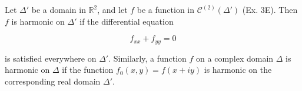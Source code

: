 Let $\Delta'$ be a domain in $\mathbb{R}^2$, and let $f$ be a function in $\mathcal{C}^{(2)}(\Delta')$ (Ex. 3E). Then $f$ is harmonic on $\Delta'$ if the differential equation

$$f_{xx} + f_{yy} = 0$$

is satisfied everywhere on $\Delta'$. Similarly, a function $f$ on a complex domain $\Delta$ is harmonic on $\Delta$ if the function $f_0(x, y) = f(x + iy)$ is harmonic on the corresponding real domain $\Delta'$.
